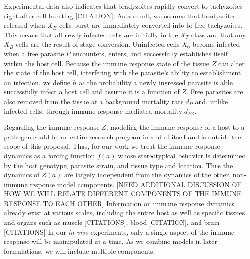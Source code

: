 \documentclass[11pt,fleqn,letterpaper]{article}
\newcommand{\invitro}{\emph{in vivo}\xspace}
\begin{document}
Experimental data also indicates that bradyzoites rapidly convert to tachyzoites right after cell bursting [CITATION].
As a result, we assume that bradyzoites released when $X_B$ cells burst are immediately converted into to free tachyzoites.
This means that all newly infected cells are initially in the $X_T$ class and that any $X_B$ cells are the result of stage conversion.
Uninfected cells $X_0$ become infected when a free parasite $P$ encounters, enters, and successfully establishes itself within the host cell.
Because the immune response state of the tissue $Z$ can alter the state of the host cell, interfering with the parasite's ability to establishment an infection, we define $h$ as the probability a newly ingressed parasite is able successfully infect a host cell and assume it is a function of $Z$.
Free parasites are also removed from the tissue at a background mortality rate $d_P$ and, unlike infected cells, through immune response mediated mortality $d_{PZ}$.

Regarding the immune response $Z$, modeling the immune response of a host to a pathogen could be an entire research program in and of itself and is outside the scope of this proposal.
Thus, for our work we treat the immune response dynamics as a forcing function $f(a)$ whose stereotypical behavior is determined by the host genotype, parasite strain, and tissue type and location.
Thus the dynamics of $Z(a)$ are largely independent from the dynamics of the other, non-immune response model components. 
[NEED ADDITIONAL DISCUSSION OF HOW WE WILL RELATE DIFFERENT COMPONENTS OF THE IMMUNE RESPONSE TO EACH OTHER]
Information on immune response dynamics already exist at various scales, including the entire host as well as specific tissues and organs  such as muscle [CITATIONS], blood [CITATION], and brain [CITATIONS]
In our \invitro experiments, only a single aspect of the immune response will be mainipulated at a time.
As we combine models in later formulations, we will include multiple components.
\end{document}
